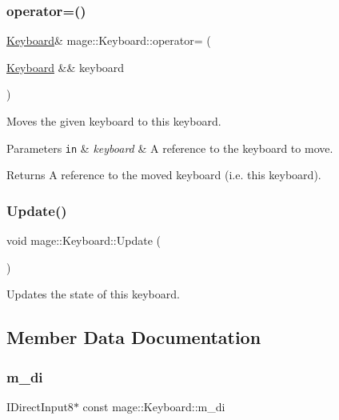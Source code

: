 \subsubsection{\texorpdfstring{operator=()}{operator=()}\hspace{0.1cm}{\footnotesize\ttfamily [2/2]}}
{\footnotesize\ttfamily \hyperlink{classmage_1_1_keyboard}{Keyboard}\& mage\+::\+Keyboard\+::operator= (\begin{DoxyParamCaption}\item[{\hyperlink{classmage_1_1_keyboard}{Keyboard} \&\&}]{keyboard }\end{DoxyParamCaption})\hspace{0.3cm}{\ttfamily [delete]}}

Moves the given keyboard to this keyboard.


\begin{DoxyParams}[1]{Parameters}
\mbox{\tt in}  & {\em keyboard} & A reference to the keyboard to move. \\
\hline
\end{DoxyParams}
\begin{DoxyReturn}{Returns}
A reference to the moved keyboard (i.\+e. this keyboard). 
\end{DoxyReturn}
\hypertarget{classmage_1_1_keyboard_abb5fd91a304f8bbf8b15ab1a277dafaf}{}\label{classmage_1_1_keyboard_abb5fd91a304f8bbf8b15ab1a277dafaf} 
\subsubsection{\texorpdfstring{Update()}{Update()}}
{\footnotesize\ttfamily void mage\+::\+Keyboard\+::\+Update (\begin{DoxyParamCaption}{ }\end{DoxyParamCaption})}

Updates the state of this keyboard. 

\subsection{Member Data Documentation}
\hypertarget{classmage_1_1_keyboard_a627eeef05bae81a60c2c44fd039ff7f8}{}\label{classmage_1_1_keyboard_a627eeef05bae81a60c2c44fd039ff7f8} 
\subsubsection{\texorpdfstring{m\+\_\+di}{m\_di}}
{\footnotesize\ttfamily I\+Direct\+Input8$\ast$ const mage\+::\+Keyboard\+::m\+\_\+di\hspace{0.3cm}{\ttfamily [private]}}

